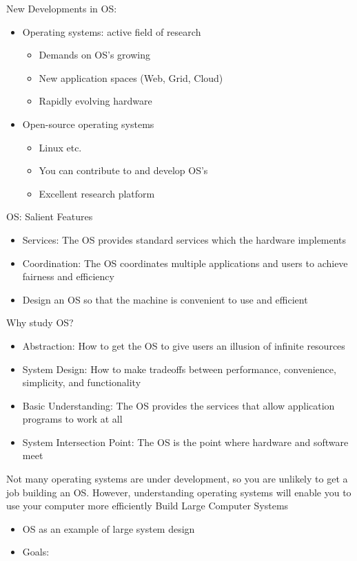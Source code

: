 \documentclass[12pt]{article}
\begin{document}
New Developments in OS:
\begin{itemize}
    \item Operating systems: active field of research
    \begin{itemize}
        \item Demands on OS's growing
        \item New application spaces (Web, Grid, Cloud)
        \item Rapidly evolving hardware
    \end{itemize}
    \item Open-source operating systems
    \begin{itemize}
        \item Linux etc.
        \item You can contribute to and develop OS's
        \item Excellent research platform
    \end{itemize}
\end{itemize}
OS: Salient Features
\begin{itemize}
    \item Services: The OS provides standard services which the hardware implements
    \item Coordination: The OS coordinates multiple applications and users to achieve fairness and efficiency
    \item Design an OS so that the machine is convenient to use and efficient
\end{itemize}
Why study OS?
\begin{itemize}
    \item Abstraction: How to get the OS to give users an illusion of infinite resources
    \item System Design: How to make tradeoffs between performance, convenience, simplicity, and functionality
    \item Basic Understanding: The OS provides the services that allow application programs to work at all
    \item System Intersection Point: The OS is the point where hardware and software meet
\end{itemize}

Not many operating systems are under development, so you are unlikely to get a job building an OS. However, understanding operating systems will enable you to use your computer more efficiently \newline
Build Large Computer Systems
\begin{itemize}
    \item OS as an example of large system design
    \item Goals: 
\end{itemize}
\newpage
\end{document}
